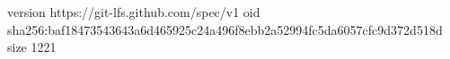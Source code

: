 version https://git-lfs.github.com/spec/v1
oid sha256:baf18473543643a6d465925c24a496f8ebb2a52994fc5da6057cfc9d372d518d
size 1221
